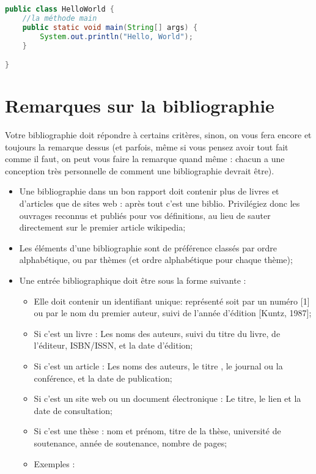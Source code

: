 \begin{spacing}{1.2}
\begin{lstlisting}[label=code:java,caption=Helloworld Java,language=java]
	public class HelloWorld {
	//la méthode main
    public static void main(String[] args) {
        System.out.println("Hello, World");
    }

}
\end{lstlisting}

\section{Remarques sur la bibliographie}
Votre bibliographie doit répondre à certains critères, sinon, on vous fera encore et
toujours la remarque dessus (et parfois, même si vous pensez avoir tout fait comme il
 faut, on peut vous faire la remarque quand même : chacun a une conception très
personnelle de comment une bibliographie devrait être).\\
\begin{itemize}
\item Une bibliographie dans un bon rapport doit contenir plus de livres et d'articles 
que de sites web : après tout c'est une biblio. Privilégiez donc les ouvrages
reconnus et publiés pour vos définitions, au lieu de sauter directement sur le premier article wikipedia;
 \item Les éléments d'une bibliographie sont de préférence classés par ordre
alphabétique, ou par thèmes (et ordre alphabétique pour chaque thème);
\item Une entrée bibliographique doit être sous la forme suivante :
\begin{itemize}
\item Elle doit contenir un identifiant unique: représenté soit par un numéro
[1] ou par le nom du premier auteur, suivi de l'année d'édition [Kuntz, 1987];
\item Si c'est un livre : Les noms des auteurs, suivi du titre du livre, de l'éditeur, 
ISBN/ISSN, et la date d'édition;
\item Si c'est un article : Les noms des auteurs, le titre , le journal ou la
conférence, et la date de publication;
\item Si c'est un site web ou un document électronique : Le titre, le lien et la date 
de consultation;
\item Si c'est une thèse : nom et prénom, titre de la thèse, université de
soutenance, année de soutenance, nombre de pages;
\item Exemples : 
\begin{description}

\end{description}
\end{itemize}
\end{itemize}
\end{spacing}
